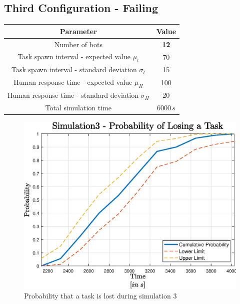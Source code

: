 \documentclass{article}
\begin{document}
		\subsection{Third Configuration - Failing}
			\label{sub:sim3}
			\begin{center}
				\begin{tabular}{ |c|c|}
					\hline
					Parameter & Value\\
					\hline
					\hline
					Number of bots & \textbf{12}\\
					\hline
					Task spawn interval - expected value $\mu_t$ & 70\\
					\hline					
					Task spawn interval - standard deviation $\sigma_t$ & 15\\
					\hline
					Human response time - expected value $\mu_H$ & 100\\
					\hline					
					Human response time - standard deviation $\sigma_H$ & 20\\
					\hline
					Total simulation time & $6000\,s$\\
					\hline
				\end{tabular}
			\end{center}
			\begin{figure}[H]
				\centering
					\includegraphics[scale = 0.7]{Images/Simulation3}
					\caption{Probability that a task is lost during simulation 3}
					\label{fig:sim3}
			\end{figure}
\end{document}
